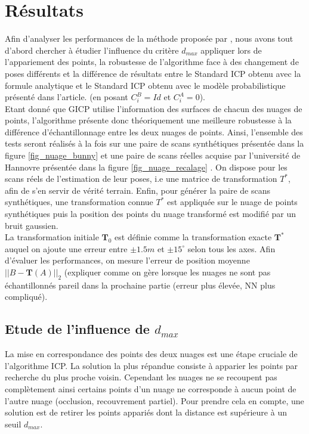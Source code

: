 \section{Résultats}
Afin d'analyser les performances de la méthode proposée par \cite{bib_gicp}, nous avons tout d'abord chercher à étudier l'influence du critère $d_{max}$ appliquer lors de l'appariement des points, la robustesse de l'algorithme face à des changement de poses différents et la différence de résultats entre le Standard ICP obtenu avec la formule analytique et le Standard ICP obtenu avec le modèle probabilistique présenté dans l'article. (en posant $C_{i}^B=Id$ et $C_{i}^A=0$).\\

Etant donné que GICP utilise l'information des surfaces de chacun des nuages de points, l'algorithme présente donc théoriquement une meilleure robustesse à la différence d'échantillonnage entre les deux nuages de points. Ainsi, l'ensemble des tests seront réalisés à la fois sur une paire de scans synthétiques présentée dans la figure \ref{fig_nuage_bunny} et une paire de scans réelles acquise par l'université de Hannovre présentée dans la figure \ref{fig_nuage_recalage} . On dispose pour les scans réels de l'estimation de leur poses, i.e une matrice de transformation $T^*$, afin de s'en servir de vérité terrain. Enfin, pour générer la paire de scans synthétiques, une transformation connue $T^{*}$ est appliquée sur le nuage de points synthétiques puis la position des points du nuage transformé est modifié par un bruit gaussien.\\

La transformation initiale $\mathbf{T}_0$ est définie comme la transformation exacte $\mathbf{T}^*$ auquel on ajoute une erreur entre $\pm1.5m$ et $\pm15^{\circ}$ selon tous les axes. Afin d'évaluer les performances, on mesure l'erreur de position moyenne $||B - \mathbf{T}(A)||_2$ (expliquer comme on gère lorsque les nuages ne sont pas échantillonnés pareil dans la prochaine partie (erreur plus élevée, NN plus compliqué). 
\subsection{Etude de l'influence de $d_{max}$}
\label{part:influencedmax}
La mise en correspondance des points des deux nuages est une étape cruciale de l'algorithme ICP. La solution la plus répandue consiste à apparier les points par recherche du plus proche voisin. Cependant les nuages ne se recoupent pas complètement ainsi certains points d'un nuage ne corresponde à aucun point de l'autre nuage (occlusion, recouvrement partiel). Pour prendre cela en compte, une solution est de retirer les points appariés dont la distance est supérieure à un seuil $d_{max}$.\\

